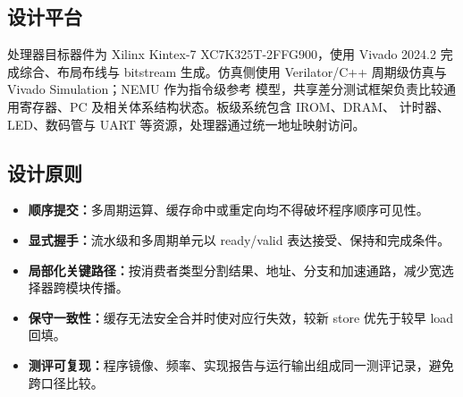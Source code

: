 \subsection{设计平台}

处理器目标器件为 Xilinx Kintex-7 XC7K325T-2FFG900，使用 Vivado 2024.2 完成综合、布局布线与
bitstream 生成。仿真侧使用 Verilator/C++ 周期级仿真与 Vivado Simulation；NEMU 作为指令级参考
模型，共享差分测试框架负责比较通用寄存器、PC 及相关体系结构状态。板级系统包含 IROM、DRAM、
计时器、LED、数码管与 UART 等资源，处理器通过统一地址映射访问。

\subsection{设计原则}

\begin{itemize}
  \item \textbf{顺序提交：}多周期运算、缓存命中或重定向均不得破坏程序顺序可见性。
  \item \textbf{显式握手：}流水级和多周期单元以 ready/valid 表达接受、保持和完成条件。
  \item \textbf{局部化关键路径：}按消费者类型分割结果、地址、分支和加速通路，减少宽选择器跨模块传播。
  \item \textbf{保守一致性：}缓存无法安全合并时使对应行失效，较新 store 优先于较早 load 回填。
  \item \textbf{测评可复现：}程序镜像、频率、实现报告与运行输出组成同一测评记录，避免跨口径比较。
\end{itemize}
